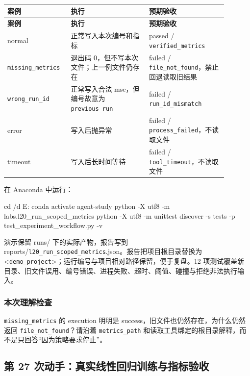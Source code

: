 {\small\setlength{\tabcolsep}{4pt}
\renewcommand{\arraystretch}{1.25}
\begin{longtable}{>{\raggedright\arraybackslash}p{0.23\linewidth}>{\raggedright\arraybackslash}p{0.33\linewidth}>{\raggedright\arraybackslash}p{0.33\linewidth}}
\toprule
\textbf{案例} & \textbf{执行} & \textbf{预期验收} \\
\midrule\endfirsthead
\toprule
\textbf{案例} & \textbf{执行} & \textbf{预期验收} \\
\midrule\endhead
\bottomrule\endfoot
normal & 正常写入本次编号和指标 & passed / \nolinkurl{verified_metrics} \\
\nolinkurl{missing_metrics} & 退出码 0，但不写本次文件；上一例文件仍存在 & failed / \nolinkurl{file_not_found}，禁止回退读取旧结果 \\
\nolinkurl{wrong_run_id} & 正常写入合法 mse，但编号故意为 \nolinkurl{previous_run} & failed / \nolinkurl{run_id_mismatch} \\
error & 写入后抛异常 & failed / \nolinkurl{process_failed}，不读取文件 \\
timeout & 写入后长时间等待 & failed / \nolinkurl{tool_timeout}，不读取文件 \\
\end{longtable}}

在 Anaconda 中运行：

\begin{Code}
cd /d E:\study\agent
conda activate agent-study
python -X utf8 -m labs.l20_run_scoped_metrics
python -X utf8 -m unittest discover -s tests -p test_experiment_workflow.py -v
\end{Code}

演示保留 runs/ 下的实际产物，报告写到 reports/\nolinkurl{l20_run_scoped_metrics}.json。报告把项目根目录替换为 <\nolinkurl{demo_project}>；运行编号与项目相对路径保留，便于复盘。12 项测试覆盖新目录、旧文件误用、编号错误、进程失败、超时、阈值、碰撞与拒绝非法执行输入。

\subsubsection{本次理解检查}

\nolinkurl{missing_metrics} 的 execution 明明是 success，旧文件也仍然存在，为什么仍然返回 \nolinkurl{file_not_found}？请沿着 \nolinkurl{metrics_path} 和读取工具绑定的根目录解释，而不是只回答“因为策略要求停止”。

\subsection{第 27 次动手：真实线性回归训练与指标验收}

